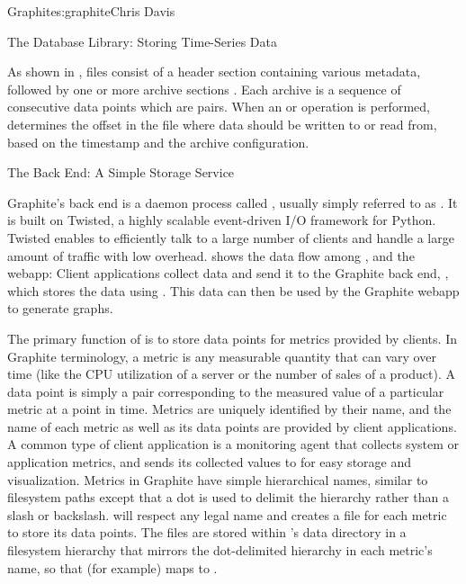 \begin{aosachapter}{Graphite}{s:graphite}{Chris Davis}
\begin{aosasect1}{The Database Library: Storing Time-Series Data}

As shown in ,  files consist of a
header section containing various metadata, followed by one or more
archive sections . Each archive is a sequence of consecutive data
points which are  pairs. When an
 or  operation is performed, 
determines the offset in the file where data should be written to or
read from, based on the timestamp and the archive configuration.

\end{aosasect1}

\begin{aosasect1}{The Back End: A Simple Storage Service}

Graphite's back end is a daemon process called , usually
simply referred to as .  It is built on Twisted, a highly
scalable event-driven I/O framework for Python. Twisted enables 
to efficiently talk to a large number of clients and handle a large
amount of traffic with low overhead.  
shows the data flow among ,  and the webapp: Client
applications collect data and send it to the Graphite back end, ,
which stores the data using . This data can then be used by the
Graphite webapp to generate graphs.


The primary function of  is to store data points for metrics
provided by clients. In Graphite terminology, a metric is any
measurable quantity that can vary over time (like the CPU utilization
of a server or the number of sales of a product). A data point is
simply a  pair corresponding to the measured
value of a particular metric at a point in time. Metrics are uniquely
identified by their name, and the name of each metric as well as its
data points are provided by client applications. A common type of
client application is a monitoring agent that collects system or
application metrics, and sends its collected values to  for easy
storage and visualization.  Metrics in Graphite have simple
hierarchical names, similar to filesystem paths except that a dot is
used to delimit the hierarchy rather than a slash or backslash.
 will respect any legal name and creates a  file for each
metric to store its data points. The  files are stored within
's data directory in a filesystem hierarchy that mirrors the
dot-delimited hierarchy in each metric's name, so that (for example)
 maps to
.


\end{aosasect1}
\end{aosachapter}
